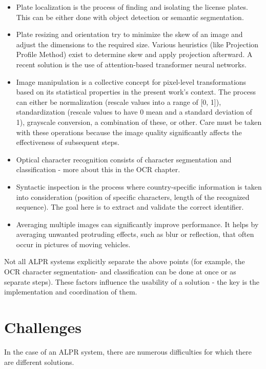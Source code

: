 \begin{itemize}
\item Plate localization is the process of finding and isolating the license plates. This can be either done with object detection or semantic segmentation.
\item Plate resizing and orientation try to minimize the skew of an image and adjust the dimensions to the required size. Various heuristics (like Projection Profile Method\cite{ProjectionProfileMethod}) exist to determine skew and apply projection afterward. A recent solution is the use of attention-based transformer neural networks\cite{SpatialTransformerNetworks}.
\item Image manipulation is a collective concept for pixel-level transformations based on its statistical properties in the present work's context. The process can either be normalization (rescale values into a range of [0, 1]), standardization (rescale values to have 0 mean and a standard deviation of 1), grayscale conversion, a combination of these, or other. Care must be taken with these operations because the image quality significantly affects the effectiveness of subsequent steps.
\item Optical character recognition consists of character segmentation and classification - more about this in the OCR chapter.
\item Syntactic inspection is the process where country-specific information is taken into consideration (position of specific characters, length of the recognized sequence). The goal here is to extract and validate the correct identifier.
\item Averaging multiple images can significantly improve performance. It helps by averaging unwanted protruding effects, such as blur or reflection, that often occur in pictures of moving vehicles.
\end{itemize}

Not all ALPR systems explicitly separate the above points (for example, the OCR character segmentation- and classification can be done at once or as separate steps). These factors influence the usability of a solution - the key is the implementation and coordination of them.

\section{Challenges}

In the case of an ALPR system, there are numerous difficulties for which there are different solutions.

